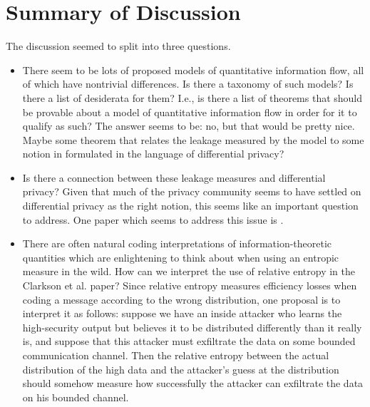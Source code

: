 \documentclass[10pt]{amsart}
\begin{document}
\section{Summary of Discussion}
The discussion seemed to split into three questions.
\begin{itemize}
  \item There seem to be lots of proposed models of quantitative information
    flow, all of which have nontrivial differences. Is there a taxonomy of such
    models? Is there a list of desiderata for them? I.e., is there a list of
    theorems that should be provable about a model of quantitative information
    flow in order for it to qualify as such? The answer seems to be: no, but
    that would be pretty nice. Maybe some theorem that relates the leakage
    measured by the model to some notion in formulated in the language of
    differential privacy?
  \item Is there a connection between these leakage measures and differential
    privacy? Given that much of the privacy community seems to have settled on
    differential privacy as the right notion, this seems like an important
    question to address. One paper which seems to address this issue is
    \cite{barthe2011}.
  \item There are often natural coding interpretations of information-theoretic
    quantities which are enlightening to think about when using an entropic
    measure in the wild. How can we interpret the use of relative entropy in 
    the Clarkson et al. paper? Since relative entropy measures efficiency losses
    when coding a message according to the wrong distribution, one proposal is
    to interpret it as follows: suppose we have an inside attacker who learns 
    the high-security output but believes it to be distributed differently than
    it really is, and suppose that this attacker must exfiltrate the data on some
    bounded communication channel. Then the relative entropy between the actual
    distribution of the high data and the attacker's guess at the distribution
    should somehow measure how successfully the attacker can exfiltrate the data
    on his bounded channel.
\end{itemize}




\end{document}
